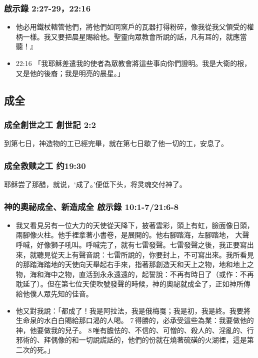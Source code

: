 \subsubsection{啟示錄 2:27-29，22:16}
\begin{itemize} 
\itemsep-.25em
\item 他必用鐵杖轄管他們，將他們如同窯戶的瓦器打得粉碎，像我從我父領受的權柄一樣。我又要把晨星賜給他。聖靈向眾教會所說的話，凡有耳的，就應當聽！』
\item  22:16 「我耶穌差遣我的使者為眾教會將這些事向你們證明。我是大衛的根，又是他的後裔；我是明亮的晨星。」
\end{itemize} 






\subsection{成全}

\subsubsection{成全創世之工 創世記 2:2}
到第七日，神造物的工已經完畢，就在第七日歇了他一切的工，安息了。

\subsubsection{成全救赎之工 约19:30}
耶稣尝了那醋，就说，‘成了。’便低下头，将灵魂交付神了。

\subsubsection{神的奧祕成全、新造成全  啟示錄 10:1-7/21:6-8}
\begin{itemize}
\item 我又看見另有一位大力的天使從天降下，披著雲彩，頭上有虹，臉面像日頭，兩腳像火柱。他手裡拿著小書卷，是展開的。他右腳踏海，左腳踏地， 
大聲呼喊，好像獅子吼叫。呼喊完了，就有七雷發聲。七雷發聲之後，我正要寫出來，就聽見從天上有聲音說：七雷所說的，你要封上，不可寫出來。我所看見的那踏海踏地的天使向天舉起右手來，指著那創造天和天上之物，地和地上之物，海和海中之物，直活到永永遠遠的，起誓說：不再有時日了（或作：不再耽延了）。但在第七位天使吹號發聲的時候，神的奧祕就成全了，正如神所傳給他僕人眾先知的佳音。 
\item 他又對我說：「都成了！我是阿拉法，我是俄梅戛；我是初，我是終。我要將生命泉的水白白賜給那口渴的人喝。 7 得勝的，必承受這些為業：我要做他的神，他要做我的兒子。 8 唯有膽怯的、不信的、可憎的、殺人的、淫亂的、行邪術的、拜偶像的和一切說謊話的，他們的份就在燒著硫磺的火湖裡，這是第二次的死。」
\end{itemize}






